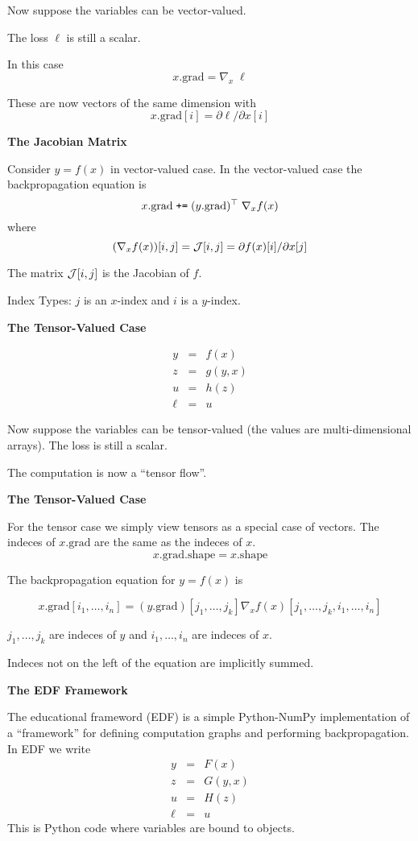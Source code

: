 \documentclass[landscape]{article}
\newcommand{\slide}[1]{
  \vfill
  \centerline{\Large\thepage}
  \eject
  \centerline{\bf #1}
  \vfill}
\newcommand{\anaslide}[1]{
  \vfill
  \centerline{\Large\thepage}
  \eject \centerline{\bf #1}}
\begin{document}
{\vfill
Now suppose the variables can be  vector-valued.

\vfill
The loss $\ell$ is still a scalar.

\vfill
In this case
$$x.\mathrm{grad} = \nabla_x\;\ell$$

\vfill
These are now vectors of the same dimension with
$$x.\mathrm{grad}[i] = \partial \ell/\partial x[i]$$

\slide{The Jacobian Matrix}
Consider $y =f(x)$ in vector-valued case.
\vfill
In the vector-valued case the backpropagation equation is
\vfill
$$x.\mathrm{grad}\; \mbox{\tt +=}\; (y.\mathrm{grad})^\top\; \nabla_x f(x)$$
\vfill
where
$$(\nabla_x f(x))[i,j] = {\cal J}[i,j] = \partial f(x)[i] /\partial x[j]$$

\vfill
The matrix ${\cal J}[i,j]$ is the Jacobian of $f$.

\vfill
Index Types: $j$ is an $x$-index and $i$ is a $y$-index.

\slide{The Tensor-Valued Case}

\begin{eqnarray*}
  y & = & f(x) \\
  z & = & g(y,x) \\
  u & = & h(z) \\
  \ell & = & u
\end{eqnarray*}

\vfill
Now suppose the variables can be  tensor-valued (the values are multi-dimensional arrays).  The loss is still a scalar.

\vfill
The computation is now a ``tensor flow''.

\slide{The Tensor-Valued Case}
For the tensor case we simply view tensors as a special case of vectors.  The indeces of $x.\mathrm{grad}$ are the
same as the indeces of $x$.
$$x.\mathrm{grad}.\mathrm{shape} = x.\mathrm{shape}$$

\vfill
The backpropagation equation for $y = f(x)$ is

$$x.\mathrm{grad}[i_1,\ldots,i_n] = (y.\mathrm{grad})[j_1,\ldots,j_k] \nabla_x f(x)[j_1,\ldots,j_k,i_1,\ldots,i_n]$$

\vfill
$j_1,\ldots,j_k$ are indeces of $y$ and $i_1,\ldots,i_n$ are indeces of $x$.

\vfill
Indeces not on the left of the equation are implicitly summed.

\anaslide{The EDF Framework}

The educational frameword (EDF) is a simple Python-NumPy implementation of a ``framework'' for defining computation graphs
and performing backpropagation. In EDF we write
\begin{eqnarray*}
  y & = & F(x) \\
  z & = & G(y,x) \\
  u & = & H(z) \\
  \ell &  = &  u
\end{eqnarray*}
\medskip
This is Python code where variables are bound to objects.

}
\end{document}
